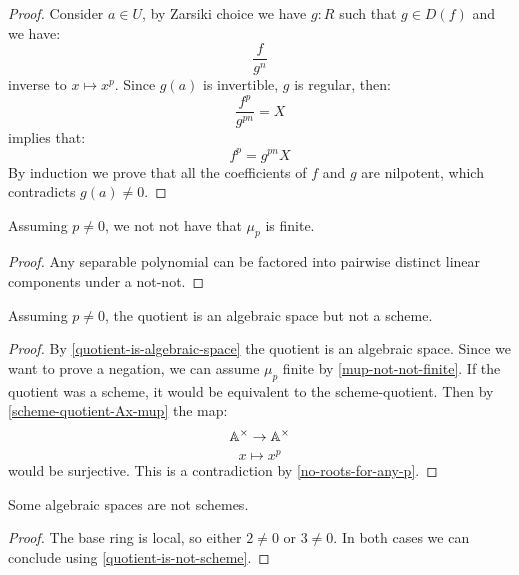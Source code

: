 \begin{proof}
Consider $a\in U$, by Zarsiki choice we have $g:R$ such that $g\in D(f)$ and we have:
\[\frac{f}{g^n}\]
inverse to $x\mapsto x^p$. Since $g(a)$ is invertible, $g$ is regular, then:
\[\frac{f^p}{g^{pn}} = X\]
implies that:
\[f^p = g^{pn}X\]
By induction we prove that all the coefficients of $f$ and $g$ are nilpotent, which contradicts $g(a)\not=0$.
\end{proof}

\begin{lemma}\label{mup-not-not-finite}
Assuming $p\not=0$, we not not have that $\mu_p$ is finite.
\end{lemma}

\begin{proof}
Any separable polynomial can be factored into pairwise distinct linear components under a not-not.
\end{proof}

\begin{proposition}\label{quotient-is-not-scheme}
Assuming $p\not=0$, the quotient is an algebraic space but not a scheme.
\end{proposition}

\begin{proof}
By \cref{quotient-is-algebraic-space} the quotient is an algebraic space. Since we want to prove a negation, we can assume $\mu_p$ finite by \cref{mup-not-not-finite}. If the quotient was a scheme, it would be equivalent to the scheme-quotient. Then by \cref{scheme-quotient-Ax-mup} the map:
\[\mathbb{A}^\times\to\mathbb{A}^\times\]
\[x\mapsto x^p\]
would be surjective. This is a contradiction by \cref{no-roots-for-any-p}.
\end{proof}

\begin{corollary}
Some algebraic spaces are not schemes.
\end{corollary}

\begin{proof}
The base ring is local, so either $2\not=0$ or $3\not=0$. In both cases we can conclude using \cref{quotient-is-not-scheme}.
\end{proof}
